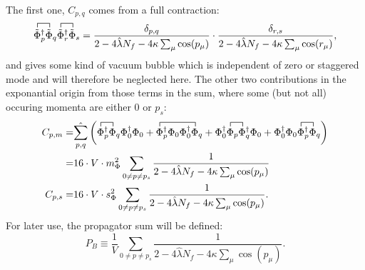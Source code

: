 The first one, $C_{p,q}$ comes from a full contraction:
\begin{equation}\label{eq:CEP_firstOrderLambda_VacuumBubble}
 \contraction{}{\tilde\Phi}{{}_p^{\dagger}}{\tilde\Phi} \tilde\Phi_p^{\dagger} \tilde\Phi_q
  \contraction{}{\tilde\Phi}{{}_r^{\dagger}}{\tilde\Phi} \tilde\Phi_r^{\dagger} \tilde\Phi_s = 
    \frac{ \delta_{p,q}}{2 - 4 \hat\lambda N_f - 4 \kappa \sum_{\mu} \cos(p_{\mu}) } \cdot 
    \frac{ \delta_{r,s}}{2 - 4 \hat\lambda N_f - 4 \kappa \sum_{\mu} \cos(r_{\mu}) },
\end{equation}
and gives some kind of vacuum bubble which is independent of zero or staggered mode 
and will therefore be neglected here.
The other two contributions in the exponantial origin from those terms in the sum, where some (but not all) occuring momenta are either $0$ or $p_s$:
\begin{align}\label{eq:CEP_firstOrderLambda_zeroModeContribution}
 C_{p,m}=& \hat{\sum\limits_{p,q}} \left( 
             \contraction{}{\Phi}{{}_p^{\dagger}}{\Phi}                              \Phi_p^{\dagger} \Phi_q \Phi_0^{\dagger} \Phi_0
           + \contraction{}{\Phi}{{}_p^{\dagger} \Phi_0 \Phi_0^{\dagger}}{\Phi}      \Phi_p^{\dagger} \Phi_0 \Phi_0^{\dagger} \Phi_q
           + \contraction{\Phi_0^{\dagger} }{\Phi}{{}_p}{\Phi}                       \Phi_0^{\dagger} \Phi_p \Phi_q^{\dagger} \Phi_0
           + \contraction{\Phi_0^{\dagger} \Phi_0 }{\Phi}{{}_p^{\dagger}}{\Phi}      \Phi_0^{\dagger} \Phi_0 \Phi_p^{\dagger} \Phi_q
            \right) \nonumber \\
        =& 16 \cdot V \cdot m_{\Phi}^2 \sum\limits_{0\neq p \neq p_s} \frac{1}{2 - 4 \hat\lambda N_f - 4 \kappa \sum_{\mu} \cos(p_{\mu})} \\
  \label{eq:CEP_firstOrderLambda_staggeredModeContribution}
 C_{p,s}=& 16 \cdot V \cdot s_{\Phi}^2 \sum\limits_{0\neq p \neq p_s} \frac{1}{2 - 4 \hat\lambda N_f - 4 \kappa \sum_{\mu} \cos(p_{\mu})}.
\end{align}
For later use, the propagator sum will be defined:
\begin{equation}\label{eq:bosonicPropagatorSum_CEP}
 P_B \equiv \frac{1}{V}\sum\limits_{0\neq p\neq p_s} \frac{1}{2 - 4 \hat\lambda N_f - 4 \kappa \sum_{\mu} \cos(p_{\mu})}.
\end{equation}

